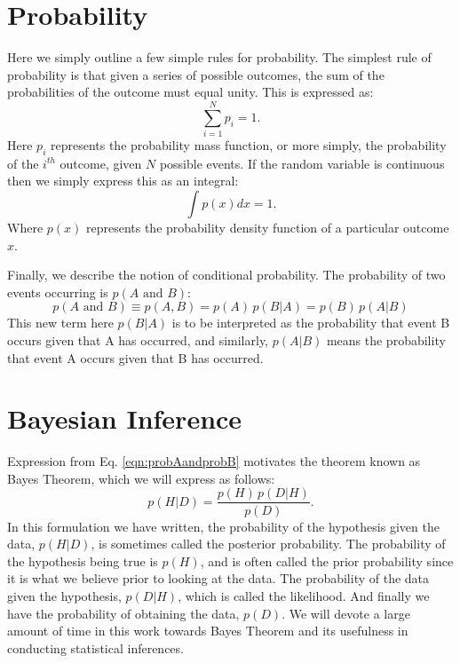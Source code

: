 \section{Probability}
Here we simply outline a few simple rules for probability. The simplest rule of probability is that given a series of possible outcomes, the sum of the probabilities of the outcome must equal unity. This is expressed as:
\begin{equation}\label{eqn:probsumdiscrete}
    \sum_{i=1}^{N} p_i = 1.
\end{equation}
Here $p_i$ represents the probability mass function, or more simply, the probability of the \textit{$i^{th}$} outcome, given $N$ possible events. If the random variable is continuous then we simply express this as an integral:
\begin{equation}\label{eqn:probsumcontinuous}
    \int p \left( x \right) dx = 1.
\end{equation}
Where $p(x)$ represents the probability density function of a particular outcome $x$.

Finally, we describe the notion of conditional probability. The probability of two events occurring is $p(A \textrm{ and } B)$:
\begin{equation}\label{eqn:probAandprobB}
    p\left(A\textrm{ and }B\right) \equiv p(A,B) = p(A) \, p(B|A) = p(B) \, p(A|B)
\end{equation}
This new term here $p(B|A)$ is to be interpreted as the probability that event B occurs given that A has occurred, and similarly, $p(A|B)$ means the probability that event A occurs given that B has occurred.

\section{Bayesian Inference}
Expression from Eq. \ref{eqn:probAandprobB} motivates the theorem known as Bayes Theorem, which we will express as follows:
\begin{equation} \label{eqn:BayesTheorem_basic}
     p(H|D) = \frac{p(H) \, p(D|H)}{p(D)}.
\end{equation}
In this formulation we have written, the probability of the hypothesis given the data, $p(H|D)$, is sometimes called the posterior probability. The probability of the hypothesis being true is $p(H)$, and is often called the prior probability since it is what we believe prior to looking at the data. The probability of the data given the hypothesis, $p(D|H)$, which is called the likelihood. And finally we have the probability of obtaining the data, $p(D)$. We will devote a large amount of time in this work towards Bayes Theorem and its usefulness in conducting statistical inferences.

